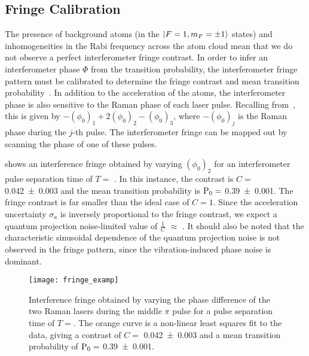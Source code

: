 \subsection{Fringe Calibration}\label{sec:fringe_cal}
The presence of background atoms (in the $\ket{F=1,m_F=\pm 1}$ states) and inhomogeneities in the Rabi
frequency across the atom cloud mean that we do not observe a perfect
interferometer fringe contrast. In order to infer an interferometer
phase $\Phi$ from the transition probability, the interferometer fringe
pattern must be calibrated to determine the fringe contrast and mean
transition probability~\cite{Peters2001}. 
In addition to the acceleration of the atoms, the interferometer phase
is also sensitive to the Raman phase of each laser pulse. Recalling
from~, this is given by $-(\phi_0)_1
+2(\phi_0)_2 - (\phi_0)_3$, where $-(\phi_0)_j$ is the Raman phase 
during the $j$-th pulse.
The interferometer fringe can be mapped out by scanning the phase of one
of these pulses.
\par\noindent
{} shows an interference fringe obtained by
varying \((\phi_0)_2\) for an interferometer pulse separation time of
$T=$ . In this instance, the contrast is $C=$
\num{0.042\pm0.003} and the mean
transition probability is $\textnormal{P}_0 =$
 \num{0.39\pm0.001}. The fringe contrast is far smaller than the ideal
 case of $C = 1$. Since the acceleration uncertainty $\sigma_a$ is inversely
 proportional to the fringe contrast, we expect a quantum projection
 noise-limited value of $\frac{1}{C} $
  $\approx$
 . It should also be noted
 that the characteristic sinusoidal dependence of the quantum
 projection noise is not observed in the fringe pattern, since the
 vibration-induced phase noise is dominant\nocite{Sugarbaker2013}.
\begin{figure}[htpb!]
  \centering
  \texttt{[image: fringe\_examp]}
  \caption[Interference fringe for \(T = \).]{Interference fringe obtained by varying the phase
    difference of the two Raman lasers during the middle \(\pi\) pulse
    for a pulse separation time of \(T = \). The orange
curve is a non-linear least squares fit to the data, giving a contrast
of $C=$ \num{0.042\pm0.003} and a mean
transition probability of $\textnormal{P}_0 =$
 \num{0.39\pm0.001}.}
 \label{fig:fringe_examp}
\end{figure}
